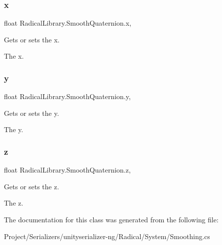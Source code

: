 \subsubsection{\texorpdfstring{x}{x}}
{\footnotesize\ttfamily float Radical\+Library.\+Smooth\+Quaternion.\+x\hspace{0.3cm}{\ttfamily [get]}, {\ttfamily [set]}}



Gets or sets the x. 

The x.\mbox{\label{class_radical_library_1_1_smooth_quaternion_a49802831b6ea1c84dcefe13469c5bac7}} 
\subsubsection{\texorpdfstring{y}{y}}
{\footnotesize\ttfamily float Radical\+Library.\+Smooth\+Quaternion.\+y\hspace{0.3cm}{\ttfamily [get]}, {\ttfamily [set]}}



Gets or sets the y. 

The y.\mbox{\label{class_radical_library_1_1_smooth_quaternion_ae2dabfebd2cf2b1bcc8050a004348185}} 
\subsubsection{\texorpdfstring{z}{z}}
{\footnotesize\ttfamily float Radical\+Library.\+Smooth\+Quaternion.\+z\hspace{0.3cm}{\ttfamily [get]}, {\ttfamily [set]}}



Gets or sets the z. 

The z.

The documentation for this class was generated from the following file\+:\begin{DoxyCompactItemize}
\item 
Project/\+Serializers/unityserializer-\/ng/\+Radical/\+System/Smoothing.\+cs\end{DoxyCompactItemize}
